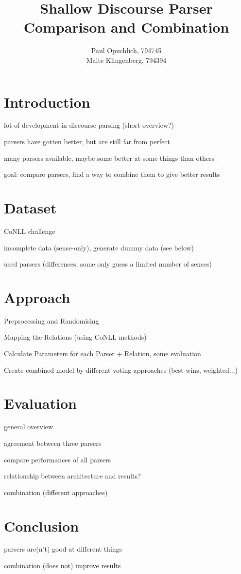 \documentclass[10pt,notitlepage]{scrartcl}
\author{Paul Opuchlich, 794745\\Malte Klingenberg, 794394}
\title{Shallow Discourse Parser Comparison and Combination}
\date{}
\begin{document}
\maketitle

\section*{Introduction}
lot of development in discourse parsing (short overview?)

parsers have gotten better, but are still far from perfect

many parsers available, maybe some better at some things than others

goal: compare parsers, find a way to combine them to give better results
\section*{Dataset}
CoNLL challenge \cite{xue2016conll}

incomplete data (sense-only), generate dummy data (see below)

used parsers (differences, some only guess a limited number of senses)
\section*{Approach}
Preprocessing and Randomising

Mapping the Relations (using CoNLL methods)

Calculate Parameters for each Parser + Relation, some evaluation

Create combined model by different voting approaches (best-wins, weighted...)
\section*{Evaluation}
general overview

agreement between three parsers

compare performances of all parsers

relationship between architecture and results?

combination (different approaches)

\section*{Conclusion}
parsers are(n't) good at different things

combination (does not) improve results

\pagebreak


\end{document}
